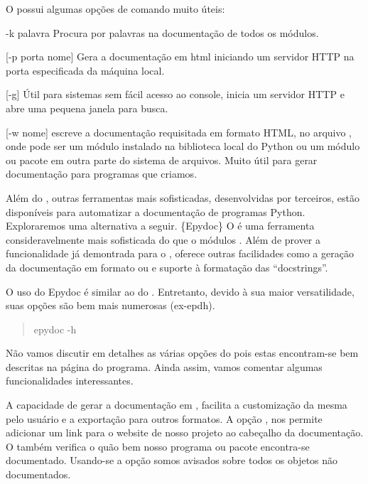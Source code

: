 \documentclass[a4paper,10pt,portuguese]{sphinxmanual}
\begin{document}
O  possui algumas opções de comando muito úteis:
\begin{optionlist}{3cm}
\item [-k palavra]  
Procura por palavras na documentação de todos os módulos.

{[}-p porta nome{]} Gera a documentação em html iniciando um servidor
HTTP na porta especificada da máquina local.

{[}-g{]} Útil para sistemas sem fácil acesso ao console, inicia um
servidor HTTP e abre uma pequena janela para busca.

{[}-w nome{]} escreve a documentação requisitada em formato HTML, no
arquivo , onde  pode ser um módulo
instalado na biblioteca local do Python ou um módulo ou pacote em
outra parte do sistema de arquivos. Muito útil para gerar
documentação para programas que criamos.
\end{optionlist}

Além do , outras ferramentas mais sofisticadas,
desenvolvidas por terceiros, estão disponíveis para automatizar a
documentação de programas Python. Exploraremos uma alternativa a
seguir. \{Epydoc\} O  é uma ferramenta consideravelmente
mais sofisticada do que o módulos . Além de prover a
funcionalidade já demontrada para o , oferece outras
facilidades como a geração da documentação em formato  ou
 e suporte à formatação das ``docstrings''.

O uso do Epydoc é similar ao do . Entretanto, devido à sua
maior versatilidade, suas opções são bem mais numerosas (ex-epdh).
\begin{quote}

epydoc -h
\end{quote}

Não vamos discutir em detalhes as várias opções do  pois
estas encontram-se bem descritas na página  do programa.
Ainda assim, vamos comentar algumas funcionalidades interessantes.

A capacidade de gerar a documentação em , facilita a customização
da mesma pelo usuário e a exportação para outros formatos. A opção
, nos permite adicionar um link para o website de nosso
projeto ao cabeçalho da documentação. O  também verifica
o quão bem nosso programa ou pacote encontra-se documentado.
Usando-se a opção  somos avisados sobre todos os objetos
não documentados.
\end{document}

